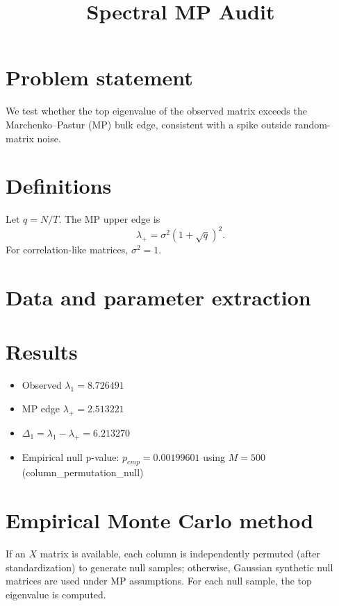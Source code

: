 \documentclass[11pt]{article}
\title{Spectral MP Audit}
\date{}
\begin{document}
\maketitle

\section*{Problem statement}
We test whether the top eigenvalue of the observed matrix exceeds the Marchenko--Pastur (MP) bulk edge, consistent with a spike outside random-matrix noise.

\section*{Definitions}
Let $q=N/T$. The MP upper edge is
\[
\lambda_+ = \sigma^2(1+\sqrt{q})^2.
\]
For correlation-like matrices, $\sigma^2=1$.

\section*{Data and parameter extraction}

\section*{Results}
\begin{itemize}
\item Observed $\lambda_1 = 8.726491$
\item MP edge $\lambda_+ = 2.513221$
\item $\Delta_1=\lambda_1-\lambda_+ = 6.213270$
\item Empirical null p-value: $p_{emp}=0.00199601$ using $M=500$ (column_permutation_null)
\end{itemize}

\section*{Empirical Monte Carlo method}
If an $X$ matrix is available, each column is independently permuted (after standardization) to generate null samples; otherwise, Gaussian synthetic null matrices are used under MP assumptions. For each null sample, the top eigenvalue is computed.
\end{document}
